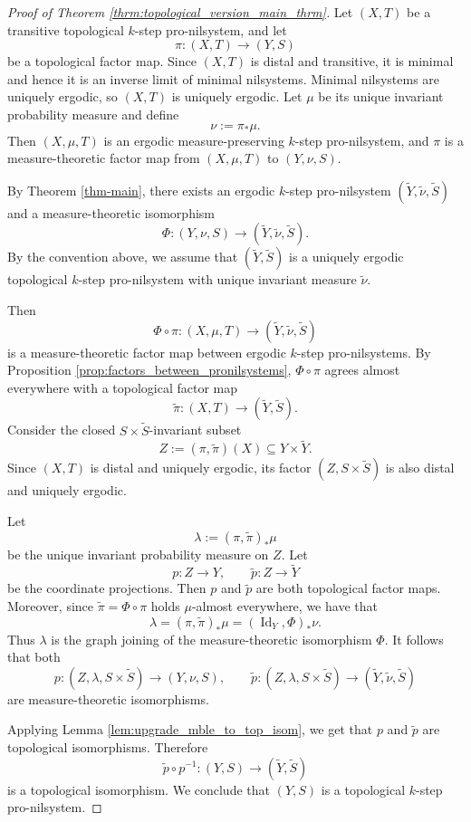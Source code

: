 \documentclass[12pt]{amsart}
\theoremstyle{plain}
\theoremstyle{definition}
\DeclareMathOperator{\Id}{Id}
\begin{document}
\begin{proof}[Proof of Theorem \ref{thrm:topological_version_main_thrm}]
    Let $(X, T)$ be a transitive topological $k$-step pro-nilsystem, and let 
    \[
    \pi \colon (X, T) \to (Y, S)
    \]
    be a topological factor map. 
    Since $(X, T)$ is distal and transitive, it is minimal and hence it is an inverse limit of minimal nilsystems. 
    Minimal nilsystems are uniquely ergodic, so $(X, T)$ is uniquely ergodic.
    Let $\mu$ be its unique invariant probability measure and define
    \[
    \nu := \pi_* \mu.
    \]
    Then $(X, \mu, T)$ is an ergodic measure-preserving $k$-step pro-nilsystem, and $\pi$ is a measure-theoretic factor map from $(X, \mu, T)$ to $(Y, \nu, S)$.

    By Theorem \ref{thm-main}, there exists an ergodic $k$-step pro-nilsystem $(\widetilde{Y}, \widetilde{\nu}, \widetilde{S})$ and a measure-theoretic isomorphism
    \[
    \Phi \colon (Y, \nu, S) \to (\widetilde{Y}, \widetilde{\nu}, \widetilde{S}).
    \]
    By the convention above, we assume that $(\widetilde{Y}, \widetilde{S})$ is a uniquely ergodic topological $k$-step pro-nilsystem with unique invariant measure $\widetilde{\nu}$.

    Then 
    \[
    \Phi \circ \pi \colon (X, \mu, T) \to (\widetilde{Y}, \widetilde{\nu}, \widetilde{S}) 
    \]
    is a measure-theoretic factor map between ergodic $k$-step pro-nilsystems. 
    By Proposition \ref{prop:factors_between_pronilsystems}, $\Phi \circ \pi$ agrees almost everywhere with a topological factor map 
    \[
    \widetilde{\pi} \colon (X, T) \to (\widetilde{Y}, \widetilde{S}).
    \]
    Consider the closed $S \times \widetilde{S}$-invariant subset 
    \[
    Z := (\pi, \widetilde{\pi})(X) \subseteq Y \times \widetilde{Y}.
    \]
    Since $(X, T)$ is distal and uniquely ergodic, its factor $(Z, S \times \widetilde{S})$ is also distal and uniquely ergodic. 

    Let 
    \[
    \lambda := (\pi, \widetilde{\pi})_* \mu
    \]
    be the unique invariant probability measure on $Z$. 
    Let 
    \[
    p \colon Z \to Y, \qquad \widetilde{p} \colon Z \to \widetilde{Y}
    \]
    be the coordinate projections.
    Then $p$ and $\widetilde{p}$ are both topological factor maps. 
    Moreover, since $\widetilde{\pi} = \Phi \circ \pi$ holds $\mu$-almost everywhere, we have that 
    \[
    \lambda = (\pi, \widetilde{\pi})_* \mu = (\Id_Y, \Phi)_* \nu.
    \]
    Thus $\lambda$ is the graph joining of the measure-theoretic isomorphism $\Phi$.
    It follows that both 
    \[
    p \colon (Z, \lambda, S \times \widetilde{S}) \to (Y, \nu, S), \qquad \widetilde{p} \colon (Z, \lambda, S \times \widetilde{S}) \to (\widetilde{Y}, \widetilde{\nu}, \widetilde{S})
    \]
    are measure-theoretic isomorphisms. 

    Applying Lemma \ref{lem:upgrade_mble_to_top_isom}, we get that $p$ and $\widetilde{p}$ are topological isomorphisms. 
    Therefore 
    \[
    \widetilde{p} \circ p^{-1} \colon (Y, S) \to (\widetilde{Y}, \widetilde{S})
    \]
    is a topological isomorphism. 
    We conclude that $(Y, S)$ is a topological $k$-step pro-nilsystem.
\end{proof}
\end{document}
